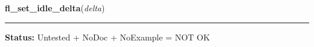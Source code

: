     \vspace{0.5ex}

\hspace{.8\funcindent}\begin{boxedminipage}{\funcwidth}

    \raggedright \textbf{fl\_set\_idle\_delta}(\textit{delta})

    \vspace{-1.5ex}

    \rule{\textwidth}{0.5\fboxrule}
\setlength{\parskip}{2ex}
\setlength{\parskip}{1ex}
\textbf{Status:} Untested + NoDoc + NoExample = NOT OK



    \end{boxedminipage}

    \label{xformslib:library:fl_add_event_callback}

    \vspace{0.5ex}


